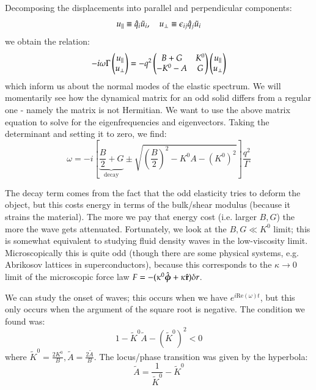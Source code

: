 Decomposing the displacements into parallel and perpendicular components:
\begin{equation}
    u_\parallel \equiv \hat{q}_i\tilde{u}_i, \quad u_\perp \equiv \epsilon_{ij}\hat{q}_j \tilde{u}_i
\end{equation}
we obtain the relation:
\begin{equation}
    -i\omega\Gamma\begin{pmatrix}u_\parallel \\ u_\perp\end{pmatrix} = -q^2\begin{pmatrix}B + G & K^0 \\ -K^0 - A & G\end{pmatrix}\begin{pmatrix}u_\parallel \\ u_\perp\end{pmatrix}
\end{equation}
which inform us about the normal modes of the elastic spectrum. We will momentarily see how the dynamical matrix for an odd solid differs from a regular one - namely the matrix is not Hermitian. We want to use the above matrix equation to solve for the eigenfrequencies and eigenvectors. Taking the determinant and setting it to zero, we find:
\begin{equation}\label{eq:oddnormalfreqs}
    \omega = -i\left[\underbrace{\frac{B}{2} + G}_{\text{decay}} \pm \sqrt{\left(\frac{B}{2}\right)^2 - K^0A - (K^0)^2}\right]\frac{q^2}{\Gamma}
\end{equation}

The decay term comes from the fact that the odd elasticity tries to deform the object, but this costs energy in terms of the bulk/shear modulus (because it strains the material). The more we pay that energy cost (i.e. larger $B, G$) the more the wave gets attenuated. Fortunately, we look at the $B, G \ll K^0$ limit; this is somewhat equivalent to studying fluid density waves in the low-viscosity limit. Microscopically this is quite odd (though there are some physical systems, e.g. Abrikosov lattices in superconductors), because this corresponds to the $\kappa \to 0$ limit of the microscopic force law $F = -(\kappa^0\hat{\mbox{\boldmath$ \phi $}} + \kappa\hat{\mathbf{r}})\delta r$. 

We can study the onset of waves; this occurs when we have $e^{i\text{Re}(\omega)t}$, but this only occurs when the argument of the square root is negative. The condition we found was:
\begin{equation}
    1 - \tilde{K}^0\tilde{A} - (\tilde{K}^0)^2 < 0
\end{equation}
where $\tilde{K}^0 = \frac{2K^0}{B}, \tilde{A} = \frac{2\tilde{A}}{B}$. The locus/phase transition was given by the hyperbola:
\begin{equation}
    \tilde{A} = \frac{1}{\tilde{K}^0} - \tilde{K}^0
\end{equation}

